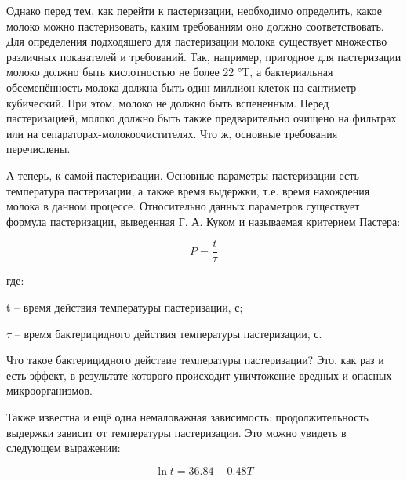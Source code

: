 {  \par \redline Однако перед тем, как перейти к пастеризации, необходимо определить, какое молоко можно пастеризовать, каким требованиям оно должно соответствовать. Для определения подходящего для пастеризации молока существует множество различных показателей и требований. Так, например, пригодное для пастеризации молоко должно быть кислотностью не более 22 °T, а бактериальная обсеменённость молока должна быть один миллион клеток на сантиметр кубический. При этом, молоко не должно быть вспененным. Перед пастеризацией, молоко должно быть также предварительно очищено на фильтрах или на сепараторах-молокоочистителях. Что ж, основные требования перечислены. 

  \par \redline А теперь, к самой пастеризации. Основные параметры пастеризации есть температура пастеризации, а также время выдержки, т.е. время нахождения молока в данном процессе. Относительно данных параметров существует формула пастеризации, выведенная Г. А. Куком и называемая критерием Пастера:
  
  \par

  \begin{equation}
    P=\frac{t}{\tau}
  \end{equation}

  \par \redline где:
  
  \par \redline t {--} время действия температуры пастеризации, с;

  \par \redline $\tau$ {--} время бактерицидного действия температуры пастеризации, с.  

  \par \redline Что такое бактерицидного действие температуры пастеризации? Это, как раз и есть эффект, в результате которого происходит уничтожение вредных и опасных микроорганизмов. 

  \par \redline Также известна и ещё одна немаловажная зависимость: продолжительность выдержки зависит от температуры пастеризации. Это можно увидеть в следующем выражении: 
  
  \par 

  \begin{equation}
    \ln{t} = 36.84 - 0.48T
  \end{equation}

}
